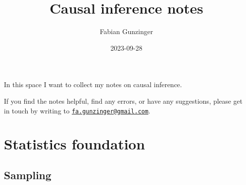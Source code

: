 \documentclass[
  letterpaper,
  DIV=11,
  numbers=noendperiod]{scrreprt}
\title{Causal inference notes}
\author{Fabian Gunzinger}
\date{2023-09-28}
\renewcommand*\contentsname{Table of contents}
\newcommand\contentsname{Table of contents}
\begin{document}
\maketitle
\ifdefined\Shaded\renewenvironment{Shaded}{\begin{tcolorbox}[breakable, frame hidden, borderline west={3pt}{0pt}{shadecolor}, sharp corners, interior hidden, boxrule=0pt, enhanced]}{\end{tcolorbox}}\fi

\renewcommand*\contentsname{Table of contents}
{
\hypersetup{linkcolor=}
\setcounter{tocdepth}{2}
\tableofcontents
}

\hypertarget{section}{%
\chapter{}\label{section}}

In this space I want to collect my notes on causal inference.

If you find the notes helpful, find any errors, or have any suggestions,
please get in touch by writing to
\href{mailto:fa.gunzinger@gmail.com}{\nolinkurl{fa.gunzinger@gmail.com}}.


\hypertarget{statistics-foundation}{%
\chapter{Statistics foundation}\label{statistics-foundation}}

\hypertarget{sampling}{%
\section{Sampling}\label{sampling}}
\end{document}
